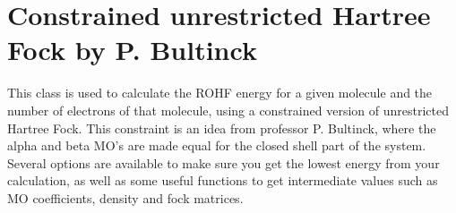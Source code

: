 \documentclass[letterpaper,10pt,english]{sphinxmanual}
\begin{document}
\label{\detokenize{cUHF_b:module-hf.cUHF_b}}

\chapter{Constrained unrestricted Hartree Fock by P. Bultinck}
\label{\detokenize{cUHF_b:constrained-unrestricted-hartree-fock-by-p-bultinck}}\label{\detokenize{cUHF_b::doc}}
This class is used to calculate the ROHF energy for a given molecule and the number of electrons of that molecule,
using a constrained version of unrestricted Hartree Fock. This constraint is an idea from professor P. Bultinck, where
the alpha and beta MO’s are made equal for the closed shell part of the system.
Several options are available to make sure you get the lowest energy from your calculation, as well as some useful
functions to get intermediate values such as MO coefficients, density and fock matrices.
\end{document}
